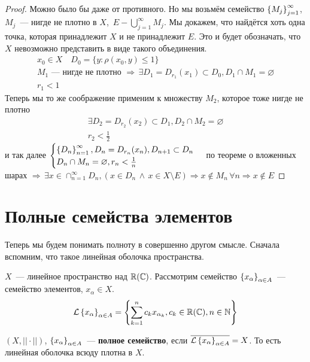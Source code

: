 \documentclass[document]{subfiles}
\begin{document}
\begin{proof}
    Можно было бы даже от противного. Но мы возьмём семейство $\left\{M_j\right\}^\infty_{j=1}$, $M_j$~--- нигде не плотно в $X$, $\, E - \bigcup^\infty_{j=1} M_j$.
      Мы докажем, 
    что найдётся хоть одна точка, которая принадлежит $X$ и не принадлежит $E$. Это и будет обозначать, что $X$ невозможно представить
    в виде такого объединения.
    \begin{gather*}
        x_0 \in X \quad D_0 = \{ y: \rho(x_0, y) \leq 1\} \\
        M_1 \text{~--- нигде не плотно } \Rightarrow \, \exists D_1 = D_{r_1}(x_1) \subset D_0, D_1 \cap M_1 = \varnothing \\
        r_1 < 1
    \end{gather*}
    Теперь мы то же соображение применим к множеству $M_2$, которое тоже нигде не плотно
    \begin{gather*}
        \exists D_2 = D_{r_2}(x_2) \subset D_1, D_2 \cap M_2 = \varnothing \\
        r_2 < \frac{1}{2}
    \end{gather*}
    и так далее $\begin{cases}
         \left\{D_n\right\}^\infty_{n=1}, D_n = D_{r_n} (x_n), D_{n+1} \subset D_n \\
         D_n \cap M_n = \varnothing, r_n < \frac{1}{n} \end{cases}$ по теореме о вложенных шарах
         $\Rightarrow \, \exists x \in \cap^\infty_{n=1}D_n, (x \in D_n \, \wedge \, x \in X \setminus E) \Rightarrow x \notin M_n \, \forall n \Rightarrow x \notin E$
\end{proof}


\section{Полные семейства элементов}

Теперь мы будем понимать полноту в совершенно другом смысле.
Сначала вспомним, что такое линейная оболочка пространства.
\begin{definition}
    $X$~--- линейное пространство над $\mathbb{R} (\mathbb{C})$. Рассмотрим семейство $\left\{x_\alpha\right\}_{\alpha \in A}$~--- семейство элементов, $x_\alpha \in X$.
    \[ \mathcal{L} \left\{x_\alpha\right\}_{\alpha \in A}  = \left\{ \sum^n_{k=1} c_k x_{\alpha_k}, c_k \in \mathbb{R} (\mathbb{C}), n \in \mathbb{N} \right\} \]
\end{definition}


\begin{definition}
    $(X, || \cdot ||)$, $\left\{x_\alpha\right\}_{\alpha \in A}$~--- \textbf{полное семейство}, если $\overline{\mathcal{L} \left\{x_\alpha\right\}_{\alpha \in A}} = X$.
    То есть линейная оболочка всюду плотна в $X$.
\end{definition}
\end{document}
